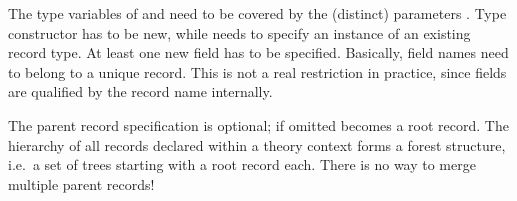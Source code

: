 \begin{isabellebody}
\begin{isamarkuptext}
\begin{description}
  The type variables of  and  need to be
  covered by the (distinct) parameters .  Type constructor  has to be new, while  needs to specify an instance of an existing record type.  At
  least one new field  has to be specified.
  Basically, field names need to belong to a unique record.  This is
  not a real restriction in practice, since fields are qualified by
  the record name internally.

  The parent record specification  is optional; if omitted
   becomes a root record.  The hierarchy of all records
  declared within a theory context forms a forest structure, i.e.\ a
  set of trees starting with a root record each.  There is no way to
  merge multiple parent records!


\end{description}
\end{isamarkuptext}
\end{isabellebody}

